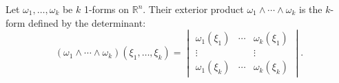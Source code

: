 Let $\omega_1, \ldots, \omega_k$ be $k$ 1-forms on $\mathbb{R}^n$. Their exterior product $\omega_1 \wedge \cdots \wedge \omega_k$ is the $k$-form defined by the determinant:
$$(\omega_1 \wedge \cdots \wedge \omega_k)(\xi_1, \ldots, \xi_k) = \begin{vmatrix} \omega_1(\xi_1) & \cdots & \omega_k(\xi_1) \\ \vdots & & \vdots \\ \omega_1(\xi_k) & \cdots & \omega_k(\xi_k) \end{vmatrix}.$$
